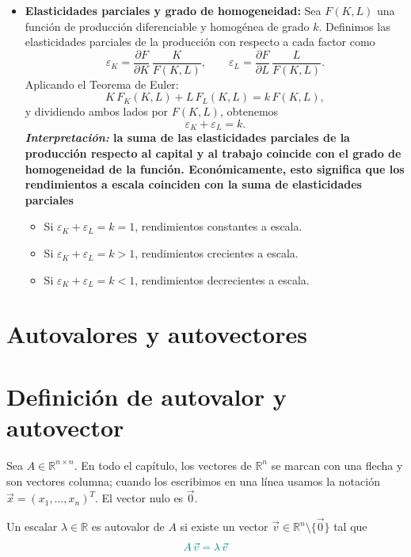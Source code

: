 \documentclass{article}
\newcommand{\vect}[1]{\vec{#1}}
\begin{document}
\begin{itemize}
  \item \textbf{Elasticidades parciales y grado de homogeneidad:}  
    Sea \(F(K,L)\) una función de producción diferenciable y homogénea de grado \(k\). Definimos las elasticidades parciales de la producción con respecto a cada factor como
    \[
      \varepsilon_K 
      = \frac{\partial F}{\partial K}\,\frac{K}{F(K,L)},
      \qquad
      \varepsilon_L
      = \frac{\partial F}{\partial L}\,\frac{L}{F(K,L)}.
    \]
    Aplicando el Teorema de Euler:
    \[
      K\,F_K(K,L) + L\,F_L(K,L) = k\,F(K,L),
    \]
    y dividiendo ambos lados por \(F(K,L)\), obtenemos
    \[
      \varepsilon_K + \varepsilon_L = k.
    \]
  \textbf{\color{teal}  \emph{Interpretación:} la suma de las elasticidades parciales de la producción respecto al capital y al trabajo coincide con el grado de homogeneidad de la función. Económicamente, esto significa que los rendimientos a escala coinciden con la suma de elasticidades parciales}
    \begin{itemize}
      \item Si \(\varepsilon_K + \varepsilon_L = k = 1\), rendimientos constantes a escala.
      \item Si \(\varepsilon_K + \varepsilon_L = k > 1\), rendimientos crecientes a escala.
      \item Si \(\varepsilon_K + \varepsilon_L = k < 1\), rendimientos decrecientes a escala.
    \end{itemize}


\end{itemize}





\newpage
\section{Autovalores y autovectores}

\section*{Definición de autovalor y autovector}

Sea \(A\in\mathbb{R}^{n\times n}\). En todo el capítulo, los vectores de \(\mathbb{R}^n\) se marcan con una flecha y son vectores columna; cuando los escribimos en una línea usamos la notación \(\vect{x}=(x_1,\dots,x_n)^T\). El vector nulo es \(\vect{0}\).

Un escalar \(\lambda\in\mathbb{R}\) es autovalor de \(A\) si existe un vector \(\vect{v}\in\mathbb{R}^n\setminus\{\vect{0}\}\) tal que
\[ \color{teal}
A\,\vect{v} = \lambda\,\vect{v}
\]
\end{document}
